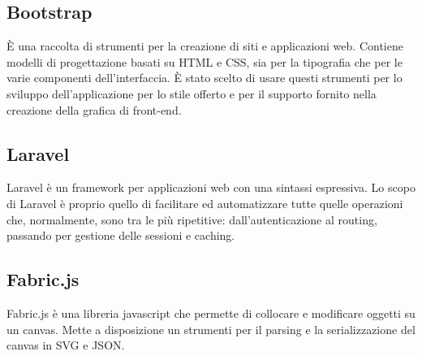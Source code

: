 \subsection{Bootstrap}
È una raccolta di strumenti per la creazione di siti e applicazioni web. Contiene modelli di progettazione basati su \gls{HTML} e \gls{CSS}, sia per la tipografia che per le varie componenti dell'interfaccia.
È stato scelto di usare questi strumenti per lo sviluppo dell'applicazione per lo stile offerto e per il supporto fornito nella creazione della grafica di \gls{front-end}.

\subsection{Laravel}
Laravel è un framework per applicazioni web con una sintassi espressiva. Lo scopo di Laravel è proprio quello di facilitare ed automatizzare tutte quelle operazioni che, normalmente, sono tra le più ripetitive: dall'autenticazione al routing, passando per gestione delle sessioni e caching.

\subsection{Fabric.js}
Fabric.js è una libreria javascript che permette di collocare e modificare oggetti su un canvas. Mette a disposizione un strumenti per il parsing e la serializzazione del canvas in SVG e JSON.
